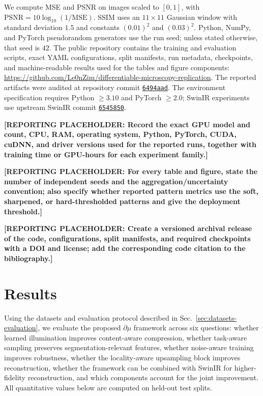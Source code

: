 \documentclass{optica-article}
\newcommand{\reportingplaceholder}[1]{\textbf{[REPORTING PLACEHOLDER: #1]}}
\begin{document}
We compute MSE and PSNR on images scaled to $[0,1]$, with $\mathrm{PSNR}=10\log_{10}(1/\mathrm{MSE})$. SSIM uses an $11\times11$ Gaussian window with standard deviation $1.5$ and constants $(0.01)^2$ and $(0.03)^2$. Python, NumPy, and PyTorch pseudorandom generators use the run seed; unless stated otherwise, that seed is $42$. The public repository contains the training and evaluation scripts, exact YAML configurations, split manifests, run metadata, checkpoints, and machine-readable results used for the tables and figure components: \url{https://github.com/Le0nZim/differentiable-microscopy-replication}. The reported artifacts were audited at repository commit \href{https://github.com/Le0nZim/differentiable-microscopy-replication/tree/6494aad7b0cfbc4373ff4d4a7db06475acc383e7}{\texttt{6494aad}}. The environment specification requires Python $\geq3.10$ and PyTorch $\geq2.0$; SwinIR experiments use upstream SwinIR commit \href{https://github.com/JingyunLiang/SwinIR/tree/6545850fbf8df298df73d81f3e8cba638787c8bd}{\texttt{6545850}}.

\reportingplaceholder{Record the exact GPU model and count, CPU, RAM, operating system, Python, PyTorch, CUDA, cuDNN, and driver versions used for the reported runs, together with training time or GPU-hours for each experiment family.}

\reportingplaceholder{For every table and figure, state the number of independent seeds and the aggregation/uncertainty convention; also specify whether reported pattern metrics use the soft, sharpened, or hard-thresholded patterns and give the deployment threshold.}

\reportingplaceholder{Create a versioned archival release of the code, configurations, split manifests, and required checkpoints with a DOI and license; add the corresponding code citation to the bibliography.}

\FloatBarrier

\section{Results}

Using the datasets and evaluation protocol described in Sec.~\ref{sec:datasets-evaluation}, we evaluate the proposed $\partial \mu$ framework across six questions: whether learned illumination improves content-aware compression, whether task-aware sampling preserves segmentation-relevant features, whether noise-aware training improves robustness, whether the locality-aware upsampling block improves reconstruction, whether the framework can be combined with SwinIR for higher-fidelity reconstruction, and which components account for the joint improvement. All quantitative values below are computed on held-out test splits.
\end{document}
